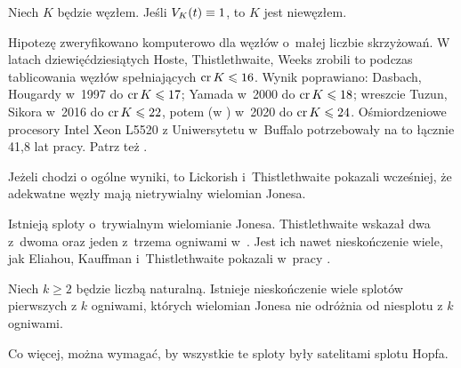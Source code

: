 \begin{conjecture}
%
\label{con:jones}%
    Niech $K$ będzie węzłem.
    Jeśli $V_K(t) \equiv 1$, to $K$ jest niewęzłem.
\end{conjecture}

Hipotezę zweryfikowano komputerowo dla węzłów o~małej liczbie skrzyżowań.
W latach dziewięćdziesiątych Hoste, Thistlethwaite, Weeks \cite{thistlethwaite98} zrobili to podczas tablicowania węzłów spełniających $\operatorname{cr} K \leqslant 16$.
%
%
%
Wynik poprawiano:
Dasbach, Hougardy \cite{hougardy97} w~1997 do $\operatorname{cr} K \leqslant 17$; 
%
%
Yamada \cite{yamada00} w~2000 do $\operatorname{cr} K \leqslant 18$;
%
wreszcie Tuzun, Sikora \cite{tuzun18} w~2016 do $\operatorname{cr} K \leqslant 22$,
%
%
potem (w \cite{tuzun21}) w~2020 do $\operatorname{cr} K \leqslant 24$.
Ośmiordzeniowe procesory Intel Xeon L5520 z Uniwersytetu w~Buffalo potrzebowały na to łącznie 41,8 lat pracy.
Patrz też \cite[s. 381]{ohtsuki02}.

Jeżeli chodzi o ogólne wyniki, to Lickorish i~Thistlethwaite \cite{lickorish88} pokazali wcześniej, że adekwatne węzły mają nietrywialny wielomian Jonesa.
%
%

Istnieją sploty o~trywialnym wielomianie Jonesa.
Thistlethwaite wskazał dwa z~dwoma oraz jeden z~trzema ogniwami w~\cite{thistlethwaite01}.
%
Jest ich nawet nieskończenie wiele, jak Eliahou, Kauffman i~Thistlethwaite pokazali w~pracy \cite{eliahou03}.
%
%

\begin{proposition}
%
%
    Niech $k \ge 2$ będzie liczbą naturalną.
    Istnieje nieskończenie wiele splotów pierwszych z $k$ ogniwami, których wielomian Jonesa nie odróżnia od niesplotu z $k$ ogniwami.

    Co więcej, można wymagać, by wszystkie te sploty były satelitami splotu Hopfa.
\end{proposition}

